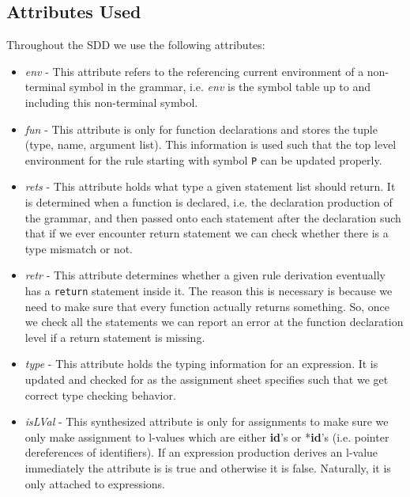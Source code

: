 \documentclass{article}
\begin{document}
\subsection{Attributes Used}
Throughout the SDD we use the following attributes:
\begin{itemize}
    \item \textit{env} - This attribute refers to the referencing current environment of a non-terminal symbol in the grammar, i.e. \textit{env} is the symbol table up to and including this non-terminal symbol.
    \item \textit{fun} - This attribute is only for function declarations and stores the tuple (type, name, argument list). This information is used such that the top level environment for the  rule starting with symbol \texttt{P} can be updated properly.
    \item \textit{rets} - This attribute holds what type a given statement list should return. It is determined when a function is declared, i.e. the declaration production of the grammar, and then passed onto each statement after the declaration such that if we ever encounter return statement we can check whether there is a type mismatch or not.
    \item \textit{retr} - This attribute determines whether a given rule derivation eventually has a \texttt{return} statement inside it. The reason this is necessary is because we need to make sure that every function actually returns something. So, once we check all the statements we can report an error at the function declaration level if a return statement is missing.
    \item \textit{type} - This attribute holds the typing information for an expression. It is updated and checked for as the assignment sheet specifies such that we get correct type checking behavior.
    \item \textit{isLVal} - This synthesized attribute is only for assignments to make sure we only make assignment to l-values which are either \textbf{id}'s or *\textbf{id}'s (i.e. pointer dereferences of identifiers). If an expression production derives an l-value immediately the attribute is is true and otherwise it is false. Naturally, it is only attached to expressions.
\end{itemize}
\end{document}
